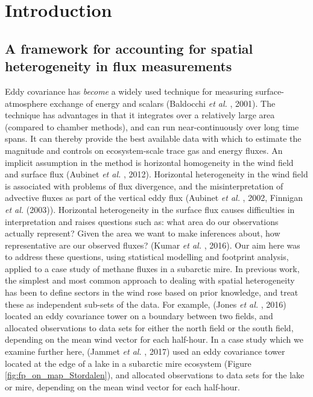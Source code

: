\section{Introduction}\label{introduction}



\subsection{A framework for accounting for spatial heterogeneity in flux
measurements}\label{a-framework-for-accounting-for-spatial-heterogeneity-in-flux-measurements}

Eddy covariance has \textit{become} a widely used technique for measuring
surface-atmosphere exchange of energy and scalars (Baldocchi \emph{et
al.} , 2001). The technique has advantages in that it integrates over a
relatively large area (compared to chamber methods), and can run
near-continuously over long time spans. It can thereby provide the best
available data with which to estimate the magnitude and controls on
ecosystem-scale trace gas and energy fluxes. An implicit assumption in
the method is horizontal homogeneity in the wind field and surface flux
(Aubinet \emph{et al.} , 2012). Horizontal heterogeneity in the wind
field is associated with problems of flux divergence, and the
misinterpretation of advective fluxes as part of the vertical eddy flux
(Aubinet \emph{et al.} , 2002, Finnigan \emph{et al.} (2003)). Horizontal
heterogeneity in the surface flux causes difficulties in interpretation
and raises questions such as: what area do our observations actually
represent? Given the area we want to make inferences about, how
representative are our observed fluxes? (Kumar \emph{et al.} , 2016). Our
aim here was to address these questions, using statistical modelling and
footprint analysis, applied to a case study of methane fluxes in a
subarctic mire.
\cite{Schaepman-Strub2009}
In previous work, the simplest and most common approach to dealing with
spatial heterogeneity has been to define sectors in the wind rose based
on prior knowledge, and treat these as independent sub-sets of the data.
For example, (Jones \emph{et al.} , 2016) located an eddy covariance
tower on a boundary between two fields, and allocated observations to
data sets for either the north field or the south field, depending on
the mean wind vector for each half-hour. In a case study which we
examine further here, (Jammet \emph{et al.} , 2017) used an eddy
covariance tower located at the edge of a lake in a subarctic mire
ecosystem (Figure \ref{fig:fp_on_map_Stordalen}), and allocated
observations to data sets for the lake or mire, depending on the mean
wind vector for each half-hour.

